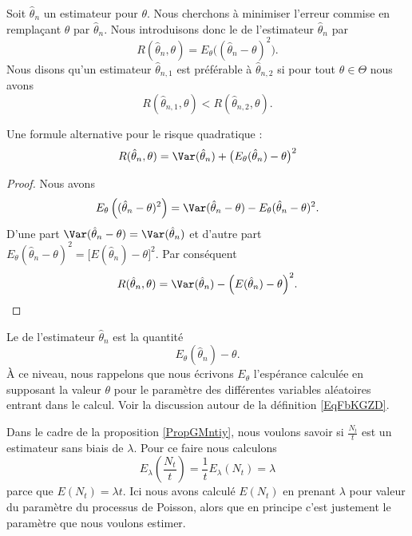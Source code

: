 Soit \( \hat\theta_n\) un estimateur pour \( \theta\). Nous cherchons à minimiser l'erreur commise en remplaçant \( \theta\) par \( \hat\theta_n\). Nous introduisons donc le  de l'estimateur \( \hat\theta_n\) par
\begin{equation}
    R(\hat\theta_n,\theta)=E_{\theta}\big( (\hat\theta_n-\theta)^2 \big).
\end{equation}
Nous disons qu'un estimateur \( \hat\theta_{n,1}\) est préférable à \( \hat\theta_{n,2}\) si pour tout \( \theta\in\Theta\) nous avons
\begin{equation}
    R(\hat\theta_{n,1},\theta)<R(\hat\theta_{n,2},\theta).
\end{equation}

\begin{lemma}
    Une formule alternative pour le risque quadratique :
    \begin{equation}
        R(\hat\theta_n,\theta)=\Var(\hat\theta_n)+\big( E_{\theta}(\hat\theta_n)-\theta \big)^2
    \end{equation}
\end{lemma}

\begin{proof}
    Nous avons
    \begin{equation}
        E_{\theta}\left( (\hat\theta_n-\theta)^2 \right)=\Var(\hat\theta_n-\theta)-E_{\theta}(\hat\theta_n-\theta)^2.
    \end{equation}
    D'une part \( \Var(\hat\theta_n-\theta)=\Var(\hat\theta_n)\) et d'autre part \( E_{\theta}(\hat\theta_n-\theta)^2=\big[ E(\hat\theta_n)-\theta \big]^2\). Par conséquent
    \begin{equation}    \label{EqRisqueetbaisiVar}
        R(\hat\theta_n,\theta)=\Var(\hat\theta_n)-\Big( E(\hat\theta_n)-\theta \Big)^2.
    \end{equation}
\end{proof}

Le  de l'estimateur \( \hat\theta_n\) est la quantité
\begin{equation}
    E_{\theta}(\hat\theta_n)-\theta.
\end{equation}
À ce niveau, nous rappelons que nous écrivons \( E_{\theta}\) l'espérance calculée en supposant la valeur \( \theta\) pour le paramètre des différentes variables aléatoires entrant dans le calcul. Voir la discussion autour de la définition \eqref{EqFbKGZD}.

\begin{example}     \label{ExytNlTq}
    Dans le cadre de la proposition \ref{PropGMntiy}, nous voulons savoir si \( \frac{ N_t }{ t }\) est un estimateur sans biais de \( \lambda\). Pour ce faire nous calculons
    \begin{equation}
        E_{\lambda}\left( \frac{ N_t }{ t } \right)=\frac{1}{ t }E_{\lambda}(N_t)=\lambda
    \end{equation}
    parce que \( E(N_t)=\lambda t\). Ici nous avons calculé \( E(N_t)\) en prenant \( \lambda\) pour valeur du paramètre du processus de Poisson, alors que en principe c'est justement le paramètre que nous voulons estimer.
\end{example}

